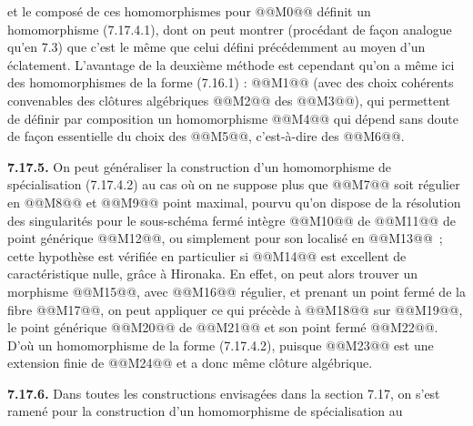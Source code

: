 
et le
composé de ces homomorphismes pour @@M0@@ définit un homomorphisme (7.17.4.1), dont on peut montrer (procédant de façon analogue qu'en 7.3) que c'est le même que celui défini précédemment au moyen d'un éclatement. L'avantage de la deuxième méthode est cependant qu'on a même ici des homomorphismes de la forme (7.16.1) :
@@M1@@
(avec des choix cohérents convenables des clôtures algébriques @@M2@@ des @@M3@@), qui permettent de définir par composition un homomorphisme
@@M4@@
qui dépend sans doute de façon essentielle du choix des @@M5@@, c'est-à-dire des @@M6@@.

\textbf{7.17.5.} On peut généraliser la construction d'un homomorphisme de spécialisation (7.17.4.2) au cas où on ne suppose plus que @@M7@@ soit régulier en @@M8@@ et @@M9@@ point maximal, pourvu qu'on dispose de la résolution des singularités pour le sous-schéma fermé intègre @@M10@@ de @@M11@@ de point générique @@M12@@, ou simplement pour son localisé en @@M13@@~; cette hypothèse est vérifiée en particulier si @@M14@@ est excellent de caractéristique nulle, grâce à Hironaka. En effet, on peut alors trouver un morphisme @@M15@@, avec @@M16@@ régulier, et prenant un point fermé de la fibre @@M17@@, on peut appliquer ce qui précède à @@M18@@ sur @@M19@@, le point générique @@M20@@ de @@M21@@ et son point fermé @@M22@@. D'où un homomorphisme de la forme (7.17.4.2), puisque @@M23@@ est une extension finie de @@M24@@ et a donc même clôture algébrique.

\textbf{7.17.6.} Dans toutes les constructions envisagées dans la section 7.17, on s'est ramené pour la construction d'un homomorphisme de spécialisation au
